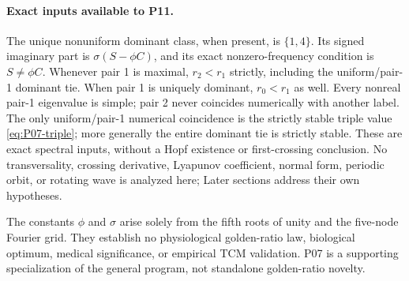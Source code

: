 \paragraph{Exact inputs available to P11.}
The unique nonuniform dominant class, when present, is $\{1,4\}$.
Its signed imaginary part is $\sigma(S-\phi C)$, and its exact
nonzero-frequency condition is $S\ne\phi C$. Whenever pair 1 is
maximal, $r_2<r_1$ strictly, including the uniform/pair-1 dominant tie.
When pair 1 is uniquely dominant, $r_0<r_1$ as well.
Every nonreal pair-1 eigenvalue is simple; pair 2 never coincides
numerically with another label. The only uniform/pair-1 numerical
coincidence is the strictly stable triple value
\eqref{eq:P07-triple}; more generally the entire dominant tie is
strictly stable. These are exact spectral inputs, without a Hopf
existence or first-crossing conclusion. No transversality, crossing
derivative, Lyapunov coefficient, normal form, periodic orbit, or rotating
wave is analyzed here; Later sections address their own hypotheses.

\begin{remark}
\label{rem:P07-geometry}
The constants $\phi$ and $\sigma$ arise solely from the fifth roots of
unity and the five-node Fourier grid. They establish no physiological
golden-ratio law, biological optimum, medical significance, or empirical
TCM validation. P07 is a supporting specialization of the general program, not standalone golden-ratio novelty. 
\end{remark}
